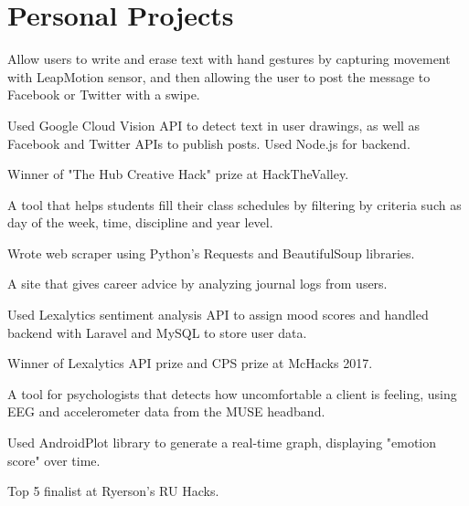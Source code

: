 \documentclass[]{deedy-resume-openfont}
\begin{document}
\begin{minipage}[t]{0.66\textwidth}

\section{Personal Projects}
\begin{tightemize}
\item Allow users to write and erase text with hand gestures by capturing movement with LeapMotion sensor, and then allowing the user to post the message to Facebook or Twitter with a swipe. 
\item Used Google Cloud Vision API to detect text in user drawings, as well as Facebook and Twitter APIs to publish posts. Used Node.js for backend.
\item Winner of "The Hub Creative Hack" prize at HackTheValley.
\end{tightemize}
\sectionsep

\begin{tightemize}
\item A tool that helps students fill their class schedules by filtering by criteria such as day of the week, time, discipline and year level.
\item Wrote web scraper using Python's Requests and BeautifulSoup libraries.
\end{tightemize}
\sectionsep

\begin{tightemize}
\item A site that gives career advice by analyzing journal logs from users.
\item Used Lexalytics sentiment analysis API to assign mood scores and handled backend with Laravel and MySQL to store user data.
\item Winner of Lexalytics API prize and CPS prize at McHacks 2017.
\end{tightemize}
\sectionsep

\begin{tightemize}
\item A tool for psychologists that detects how uncomfortable a client is feeling, using EEG and accelerometer data from the MUSE headband.
\item Used AndroidPlot library to generate a real-time graph, displaying "emotion score" over time. 
\item Top 5 finalist at Ryerson's RU Hacks.
\end{tightemize}
\sectionsep


\end{minipage} 
\end{document}
